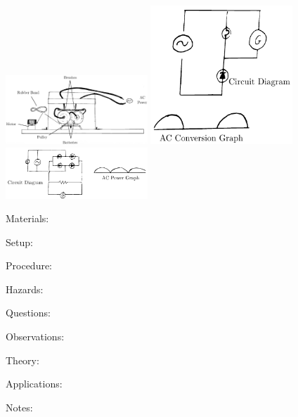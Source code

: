 \begin{multicols}{2}
\begin{center}
\includegraphics[width=0.4\textwidth]{./img/inverter.png}
\includegraphics[width=0.4\textwidth]{./img/half-wave-rectifier.png}
\includegraphics[width=0.4\textwidth]{./img/full-wave-rectifier.png}
\end{center}

\begin{description*}
\item[Materials:]{}
\item[Setup:]{}
\item[Procedure:]{}
\item[Hazards:]{}
\item[Questions:]{}
\item[Observations:]{}
\item[Theory:]{}
\item[Applications:]{}
\item[Notes:]{}
\end{description*}



\end{multicols}

\pagebreak